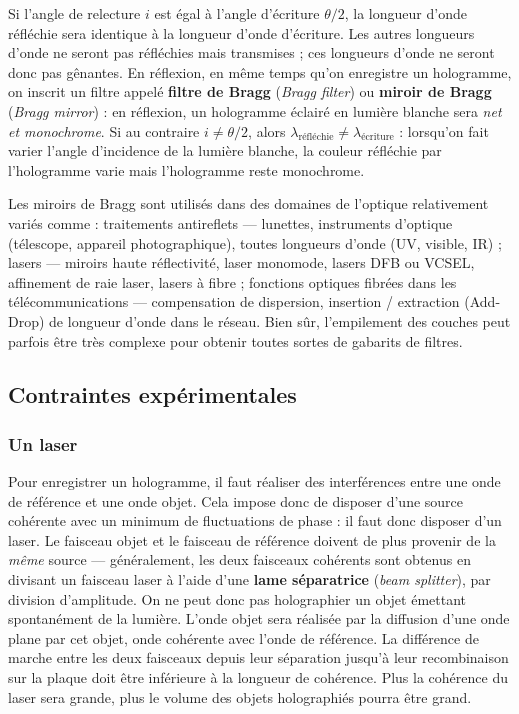\begin{conclusion}
  Si l'angle de relecture $i$ est égal à l'angle d'écriture $\theta/2$, la
  longueur d'onde réfléchie sera identique à la longueur d'onde d'écriture. Les
  autres longueurs d'onde ne seront pas réfléchies mais transmises ; ces
  longueurs d'onde ne seront donc pas gênantes. En réflexion, en même temps
  qu'on enregistre un hologramme, on inscrit un filtre appelé \textbf{filtre de
  Bragg} (\textit{Bragg filter}) ou \textbf{miroir de Bragg} (\textit{Bragg
  mirror}) : en réflexion, un hologramme éclairé en lumière blanche sera
  \emph{net et monochrome}. Si au contraire $i \neq \theta/2$, alors
  $\lambda_{\text{réfléchie}} \neq \lambda_{\text{écriture}}$ : lorsqu'on fait
  varier l'angle d'incidence de la lumière blanche, la couleur réfléchie par
  l'hologramme varie mais l'hologramme reste monochrome.
\end{conclusion}

\begin{remark}
  Les miroirs de Bragg sont utilisés dans des domaines de l'optique relativement
  variés comme : traitements antireflets --- lunettes, instruments d'optique
  (télescope, appareil photographique), toutes longueurs d'onde (UV, visible,
  IR) ; lasers --- miroirs haute réflectivité, laser monomode, lasers DFB ou
  VCSEL, affinement de raie laser, lasers à fibre ; fonctions optiques fibrées
  dans les télécommunications --- compensation de dispersion, insertion /
  extraction (Add-Drop) de longueur d'onde dans le réseau. Bien sûr,
  l'empilement des couches peut parfois être très complexe pour obtenir toutes
  sortes de gabarits de filtres.
\end{remark}

\subsection{Contraintes expérimentales}

\subsubsection{Un laser}
Pour enregistrer un hologramme, il faut réaliser des interférences entre une
onde de référence et une onde objet. Cela impose donc de disposer d'une source
cohérente avec un minimum de fluctuations de phase : il faut donc disposer d'un
laser. Le faisceau objet et le faisceau de référence doivent de plus provenir de
la \emph{même} source --- généralement, les deux faisceaux cohérents sont
obtenus en divisant un faisceau laser à l'aide d'une \textbf{lame séparatrice}
(\textit{beam splitter}), par division d'amplitude. On ne peut donc pas
holographier un objet émettant spontanément de la lumière. L'onde objet sera
réalisée par la diffusion d'une onde plane par cet objet, onde cohérente avec
l'onde de référence. La différence de marche entre les deux faisceaux depuis leur
séparation jusqu'à leur recombinaison sur la plaque doit être inférieure à la
longueur de cohérence. Plus la cohérence du laser sera grande, plus le volume des
objets holographiés pourra être grand.


